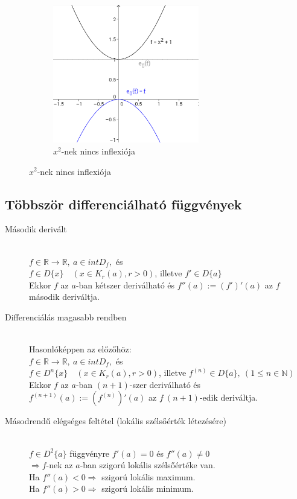 \documentclass[margin=0px]{article}
\newcommand{\R}{\mathbb{R}}
\begin{document}
\begin{description}
\begin{figure}[H]
\begin{subfigure}{.33\textwidth}
                \centering
                \includegraphics[width=0.7\textwidth]{img/inflexio_x2.png}
                \caption{$x^2$-nek nincs inflexiója}
            \end{subfigure}
        \end{figure}
\end{description}
\subsection{Többször differenciálható függvények}
\begin{description}
    \item[Második derivált] \hfill \\
        $ f \in \R \rightarrow \R, \ a \in intD_f, $ és \\
        $ f \in D\{x\} \quad (x \in K_r(a), r>0)$, illetve $f' \in D\{a\}$ \\
        Ekkor $f$ az $a$-ban kétszer deriválható és $f''(a) := (f')'(a) $ az $f$ második deriváltja.
    \item[Differenciálás magasabb rendben] \hfill \\
        Hasonlóképpen az előzőhöz:\\
        $ f \in \R \rightarrow \R, \ a \in intD_f, $ és \\
        $ f \in D^n\{x\} \quad (x \in K_r(a), r>0)$, illetve $f^{(n)} \in D\{a\}, \ (1 \leq n \in \mathbb{N})$ \\
        Ekkor $f$ az $a$-ban $(n+1)$-szer deriválható és $f^{(n+1)}(a) := (f^{(n)})'(a) $ az $f \ (n+1)$-edik deriváltja.
    \item[Másodrendű elégséges feltétel (lokális szélsőérték létezésére)] \hfill \\
        $ f \in D^2\{a\}$ függvényre $f'(a) = 0$ és $f''(a) \neq 0 $ \\
        $ \Rightarrow f$-nek az $a$-ban szigorú lokális szélsőértéke van. \\
        Ha $f''(a) < 0 \Rightarrow $ szigorú lokális maximum. \\
        Ha $f''(a) > 0 \Rightarrow $ szigorú lokális minimum.
\end{description}
\end{document}
